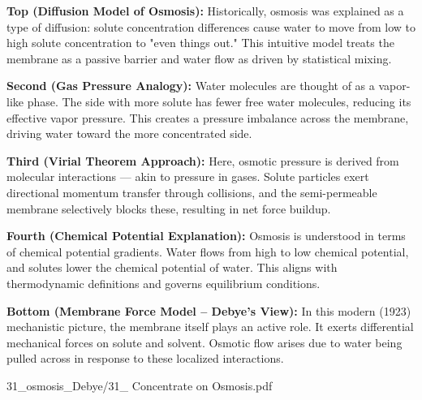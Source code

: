 \begin{SideNotePage}{
  \textbf{Top (Diffusion Model of Osmosis):}  
  Historically, osmosis was explained as a type of diffusion: solute concentration differences cause water to move from low to high solute concentration to "even things out." This intuitive model treats the membrane as a passive barrier and water flow as driven by statistical mixing. \par

  \textbf{Second (Gas Pressure Analogy):}  
  Water molecules are thought of as a vapor-like phase. The side with more solute has fewer free water molecules, reducing its effective vapor pressure. This creates a pressure imbalance across the membrane, driving water toward the more concentrated side. \par

  \textbf{Third (Virial Theorem Approach):}  
  Here, osmotic pressure is derived from molecular interactions — akin to pressure in gases. Solute particles exert directional momentum transfer through collisions, and the semi-permeable membrane selectively blocks these, resulting in net force buildup. \par

  \textbf{Fourth (Chemical Potential Explanation):}  
  Osmosis is understood in terms of chemical potential gradients. Water flows from high to low chemical potential, and solutes lower the chemical potential of water. This aligns with thermodynamic definitions and governs equilibrium conditions. \par

  \textbf{Bottom (Membrane Force Model – Debye's View):}  
  In this modern (1923) mechanistic picture, the membrane itself plays an active role. It exerts differential mechanical forces on solute and solvent. Osmotic flow arises due to water being pulled across in response to these localized interactions. \par
}{31_osmosis_Debye/31_ Concentrate on Osmosis.pdf}
\end{SideNotePage}
